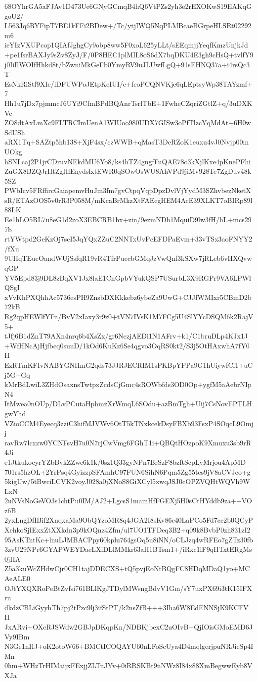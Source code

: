 68OYhrGA5aFJAv1D473Ue6GNyGCmqB4hQ6VtPZs2yh3e2rEXOKwS19EAKqGgoU2/
L563Jq6RYFipT7BE1kFFi2BDew+/Tc/ytjIWQ5NqPLMBcaeBGrpeHLSRt02292m6
ieYIzVXUPcop1QIAfJghgCy9obp8ww5F0xoL625yLLt/sEEqmjjYeqfKmzUnjkJd
+pe1fsrBAXJy9sZv8ZyJ/F/0P8HEC1plMIL8oS6dX7bqDKU4E3gh9cHsQ+tvlfY9
j0IiIlWOIfHhkd8t/bZwniMkGeFb0YmyRV9uJLUwfLgQ+91sEHNQ37a+i4rsQc3T
EsNkRiStf9XIc/lDFUWPoJEtpKeIUI/e+feoPCQNVKje6qLEptsyWp38TAYzmf+7
Hh1u7jDx7pjmmcJ6UYi9CfmBPdBQAnrTsrlTbE+1FwheCZqriZGtlZ+q/3uDXKVc
ZO8dtAxLmXc9FLTRCImUenA1WIUoo980UDX7GISw3oPfTlzcYqMdAt+6H0wSdUSh
aRX1Tq+SAZtp5hb138+XjF4sx/czWWB+qMasT3DeRZoK1euxu4vJ0Nvjp00mUOkg
hSNLcaj2P1jrCDruvNEkdMU6Yo8/ks4hTZ4gngfFuQAE78o3kXjlKxe4pKnePFhi
ZuGX8BZQJrHtZgHlEnydslxtEWR0qSOwOsWU8AhVPd9jiMv928Te7ZgDuv48k5SZ
PWbIcv5FRffircGaiapemvHuJm3fm7gvCtpqVqpDpzDvlVjYydM3SZhvbezNketX
sR/ETAzOOS5v0rR3P058M/mKcaBrMkzXtFAEegHEM4AcE39XLKT7oBIRp89l88LK
Ee1hLO5RL7u8eG1d2zoX3EBCRB1hx+zin/9ezmNDb1MquiD9lw3fH/hL+mcs297b
rtYWtpd2GeKzOj7scI5JqYQxZZuC2NNTxUvPcEFDPaEvm+33vTSx3aoFNYY2/fXu
9UHqTEueOandWUjSsfqR19vR4TfrPuecbGMqJzVwQnf3kSXw7jRLeb6vHXQvwqGP
YV5Epd83j9DL8zBqXV1Jx8laE1CnGpbVYukQSP7USurbL3X9RGPr9VA6LPWlQSgI
xVvKhPXQhhAc5736esPH9ZnsbDXKkkebz6ybeZa9UwG+CJJfWMIxr5CBmD2b72kB
Rg2qpHEWlfYFn/BvV2xIaxy3r9z0+tVN7IVsK1M7FCg5U4SlYYcDSQM6k2RajV5+
tJfj6B1dZnT79AXn4nrq6b4XsZx/gr6NczjAEDi1N1AFrv+k1/C1bruDLp4KJx1J
+WfHNcAjHjfbcq0suuD/1kOd6KuKz6Se4qgvo3OqRS0kt2/S3j5OtHAxwhA7fY0H
EzRTmKFIvNABYGNHmG2qds73JJRJECRIM1sPKBpYPPa9G1hUiywfCi1+uCj5G+Gq
kMrBdLwiL3ZHdOsaxnsTwtpxZcdsCjGmc4sROWbfds3OD0Op+ygfM5aAebrNIpN4
ItMwea0nOUp/DLvPCutaHphmzXrWmqL6SOdu+azBmTgh+Uij7CsNovEPTLHgwYhd
VZioCCM4Eyecq3zziC3hifMJVWv6OtT5kTNxkcekDsyFBXb93FsxP4SOqcL9Omjj
ravRw7lcxzw0YCNFsvH7u0N7rjCwVmg6FGhT1i+QBQtHOzpoK9Xmuxu3sb9rR4Ji
e1JtkukocyrYZbBvkZZwc6k1k/0sz1Q33gyNPn7BrSzF8bzftScpLyMrjou4ApMD
701rs5hzOL+2YrPsq4GyizzpSFAmhC97FUN6SihN6Pqm5Zg55tes9jV8aCVJeo+g
5kigUw/5tBwciLCVK2voyJ028a0jXNoS8GiXCyl5xwqJSJ0cOPZVQHtWQVh9WLxN
2uNVsNoGeVO3s1chtPu0IM/AJ2+LgcsS1mamHfFGEXj5H0sCtHYddb9za++VOz6B
2yxLngDfIBif2XnqxaMa9ObQYzoMR8q4JGA2I8sKv86e40LaPCo5Fd7cc2b0QCyP
XehkoSjIExxZtXXkdn3p9kOQnz4Zfm/ul7UO1TFDeq3B2+q09k8BvbP0zh831zI2
95AsKTntKc+lnuLJMBACPpy60kplu764gsOq5u8iNN/oCLJzq4wRFEo7gZTz30fb
3zvU29NPr6GYAPWEYDaeLXiDLlMMkr63aH1BTsm1+/iRxc1lF9qHTxtERgMs0jHA
Z5a3kuWcZHdwCjr0CH1tajDDECXS+tQ5pvjEoNtBQgFC8HDqMDaQ1yo+MCAeALE0
OJtYXQXRoPeBtZvfsi761BLlKgJTDylMWsngBdvV1Gm/sY7uxPX69i3tK15IFXrn
dkdzCBLiGyyhTh7pj2tPzc9lj3ifStPT/k2nsZfB+++3Iha6W8EdENNSjK9KCFVH
JxARvi+OXcRJSWdw2GBJpDKqpKn/NDBKjbexC2uOIvB+QjIOisGMoEMD6JVy9IBm
N3Ge1nHJ+oK2otoW66+BMCtICOQAYU60nLFoScUya4D4mqlgerjpuNRJieSp4IMn
0hm+WHzTrHIMaijxFExjjZLTnJYv+0iRRSKBt9nNWz8I84x88XmBegwwEyb8VXJa
